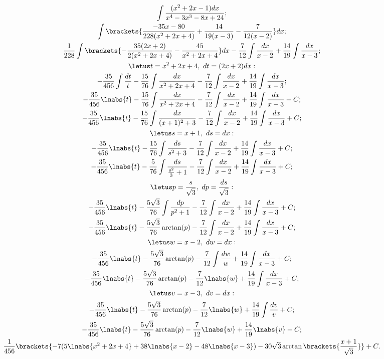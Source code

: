 \newpage
\noindent \pu
\begin{gather*}
    \int\frac{(x^2+2x-1)dx}{x^4-3x^3-8x+24};\\
    \int\brackets{\frac{-35x-80}{228(x^2+2x+4)} + \frac{14}{19(x-3)}-\frac{7}{12(x-2)}}dx;\\
    \frac{1}{228}\int\brackets{-\frac{35(2x+2)}{2(x^2+2x+4)} - \frac{45}{x^2+2x+4}}dx - \frac{7}{12}\int\frac{dx}{x-2} + \frac{14}{19}\int\frac{dx}{x-3};\\
    \letus t = x^2+2x+4,\ dt = (2x+2)dx:\\
    -\frac{35}{456}\int\frac{dt}{t} - \frac{15}{76}\int\frac{dx}{x^2+2x+4}- \frac{7}{12}\int\frac{dx}{x-2} + \frac{14}{19}\int\frac{dx}{x-3};\\
    -\frac{35}{456}\lnabs{t} - \frac{15}{76}\int\frac{dx}{x^2+2x+4}- \frac{7}{12}\int\frac{dx}{x-2} + \frac{14}{19}\int\frac{dx}{x-3} + C;\\
    -\frac{35}{456}\lnabs{t} - \frac{15}{76}\int\frac{dx}{(x+1)^2 + 3}- \frac{7}{12}\int\frac{dx}{x-2} + \frac{14}{19}\int\frac{dx}{x-3} + C;\\
    \letus s = x+1,\ ds = dx:\\
    -\frac{35}{456}\lnabs{t} - \frac{15}{76}\int\frac{ds}{s^2 + 3}- \frac{7}{12}\int\frac{dx}{x-2} + \frac{14}{19}\int\frac{dx}{x-3} + C;\\
    -\frac{35}{456}\lnabs{t} - \frac{5}{76}\int\frac{ds}{\frac{s^2}{3}+1}- \frac{7}{12}\int\frac{dx}{x-2} + \frac{14}{19}\int\frac{dx}{x-3} + C;\\
    \letus p = \frac{s}{\sqrt{3}},\ dp = \frac{ds}{\sqrt{3}}:\\
    -\frac{35}{456}\lnabs{t} - \frac{5\sqrt{3}}{76}\int\frac{dp}{p^2+1}- \frac{7}{12}\int\frac{dx}{x-2} + \frac{14}{19}\int\frac{dx}{x-3} + C;\\
    -\frac{35}{456}\lnabs{t} - \frac{5\sqrt{3}}{76}\arctan(p)- \frac{7}{12}\int\frac{dx}{x-2} + \frac{14}{19}\int\frac{dx}{x-3} + C;\\
    \letus w = x-2,\ dw = dx:\\
    -\frac{35}{456}\lnabs{t} - \frac{5\sqrt{3}}{76}\arctan(p)- \frac{7}{12}\int\frac{dw}{w} + \frac{14}{19}\int\frac{dx}{x-3} + C;\\
    -\frac{35}{456}\lnabs{t} - \frac{5\sqrt{3}}{76}\arctan(p)- \frac{7}{12}\lnabs{w} + \frac{14}{19}\int\frac{dx}{x-3} + C;\\
    \letus v = x-3,\ dv = dx:\\
    -\frac{35}{456}\lnabs{t} - \frac{5\sqrt{3}}{76}\arctan(p)- \frac{7}{12}\lnabs{w} + \frac{14}{19}\int\frac{dv}{v} + C;\\
    -\frac{35}{456}\lnabs{t} - \frac{5\sqrt{3}}{76}\arctan(p)- \frac{7}{12}\lnabs{w} + \frac{14}{19}\lnabs{v} + C;\\
    \frac{1}{456}\brackets{-7(5\lnabs{x^2+2x+4} + 38\lnabs{x-2} - 48\lnabs{x-3}) - 30\sqrt{3}\arctan\brackets{\frac{x+1}{\sqrt{3}}}} + C.
\end{gather*}

